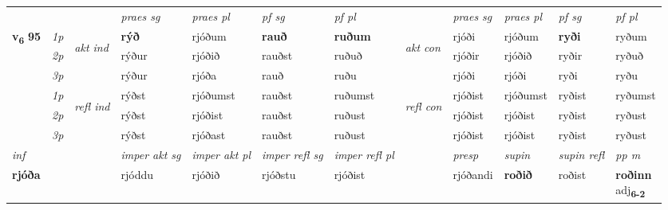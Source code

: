 \begin{longtable}[l]{X>{\footnotesize\itshape}llXXXXlXXXX}
\midrule

 & &   & \textit{praes sg}  & \textit{praes pl}    & \textit{ pf sg} & \textit{pf pl} & & \textit{praes sg}  & \textit{praes pl}    & \textit{pf sg} & \textit{pf pl }  \\ \cmidrule{4-7} \cmidrule{9-12}
 \multirow{2}{*}{{{\textbf{v{\textsubscript{6}}} \Large{\textbf{95}}}}}  & 1p & \multirow{3}{*}{\begin{turn}{90}\textit{akt ind}\end{turn}} & \textbf{rýð} & rjóðum & \textbf{rauð} & \textbf{ruðum} & \multirow{3}{*}{\begin{turn}{90}\textit{akt con}\end{turn}} &rjóði & rjóðum & \textbf{ryði} & ryðum\\*
 & 2p &  &  rýður  & rjóðið & rauðst & ruðuð & & rjóðir & rjóðið & ryðir & ryðuð \\*
 & 3p &  & rýður & rjóða & rauð & ruðu & & rjóði & rjóði& ryði & ryðu \\*
\cmidrule{4-7} \cmidrule{9-12}
 & 1p & \multirow{3}{*}{\begin{turn}{90}\textit{refl ind}\end{turn}}  & rýðst & rjóðumst & rauðst & ruðumst & \multirow{3}{*}{\begin{turn}{90}\textit{refl con}\end{turn}}  &rjóðist & rjóðumst & ryðist & ryðumst \\*
 & 2p &  & rýðst & rjóðist & rauðst & ruðust & &rjóðist & rjóðist & ryðist & ryðust \\*
 & 3p  & & rýðst & rjóðast & rauðst & ruðust & & rjóðist & rjóðist& ryðist & ryðust \\*
\cmidrule{4-7} \cmidrule{9-12}

   {\textit{inf}} & &  & \textit{imper akt sg} & \textit{imper akt pl} & \textit{imper refl sg} & \textit{imper refl pl} && \textit{presp} & \textit{supin} & \textit{supin refl} & \textit{pp m} \\*
  {\textbf{rjóða}} & && rjóddu  & rjóðið & rjóðstu & rjóðist && rjóðandi &  \textbf{roðið} & roðist & \specialcell{\textbf{roðinn} \\ adj\textbf{\textsubscript{6-2}}} \\*

\midrule


\end{longtable}
